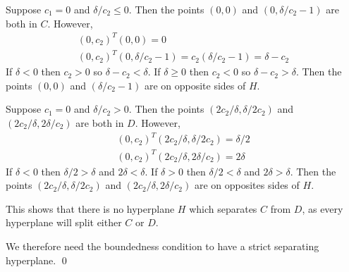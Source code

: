\documentclass[10pt]{article}
\begin{document}
\begin{solution}
\begin{enumerate}
        Suppose \( c_1 = 0 \) and \( \delta/c_2 \leq 0 \). Then the points \( (0,0) \) and \( (0,\delta/c_2-1) \) are both in \( C \). However,
        \begin{align*}
            (0,c_2)^T(0,0) = 0 \\
            (0,c_2)^T(0,\delta/c_2-1) = c_2(\delta/c_2-1) = \delta - c_2
        \end{align*}
        If \( \delta < 0 \) then \( c_2 > 0 \) so \( \delta - c_2 < \delta \). If \( \delta \geq 0 \) then \( c_2 < 0 \) so \( \delta - c_2 > \delta \). Then the points \( (0,0) \) and \( (\delta/c_2-1) \) are on opposite sides of \( H \).

        Suppose \( c_1 = 0 \) and \( \delta/c_2 > 0 \). Then the points \( (2c_2/\delta, \delta/2c_2)  \) and \( (2c_2/\delta, 2\delta/c_2) \) are both in \( D \). However, 
        \begin{align*}
            (0,c_2)^T(2c_2/\delta,\delta/2c_2) = \delta/2 \\
            (0,c_2)^T(2c_2/\delta,2\delta/c_2) = 2\delta
        \end{align*}
        If \( \delta < 0 \) then \( \delta/2 > \delta \) and \( 2\delta < \delta \). If \( \delta > 0 \) then \( \delta/2 < \delta \) and \( 2\delta > \delta \). Then the points \( (2c_2/\delta, \delta/2c_2)  \) and \( (2c_2/\delta, 2\delta/c_2) \) are on opposites sides of \( H \).

        This shows that there is no hyperplane \( H \) which separates \( C \) from \( D \), as every hyperplane will split either \( C \) or \( D \).
        

        We therefore need the boundedness condition to have a strict separating hyperplane. \qed

\end{enumerate}
\end{solution}
\end{document}
